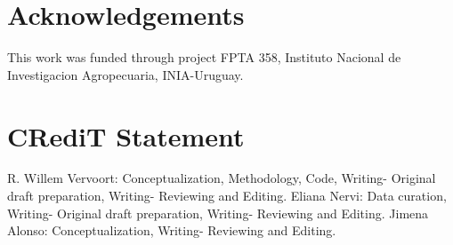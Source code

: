 \documentclass[]{elsarticle} %
\begin{document}
\hypertarget{acknowledgements}{%
\section{Acknowledgements}\label{acknowledgements}}

This work was funded through project FPTA 358, Instituto Nacional de Investigacion Agropecuaria, INIA-Uruguay.

\hypertarget{credit-statement}{%
\section{CRediT Statement}\label{credit-statement}}

R. Willem Vervoort: Conceptualization, Methodology, Code, Writing- Original draft preparation, Writing- Reviewing and Editing. Eliana Nervi: Data curation, Writing- Original draft preparation, Writing- Reviewing and Editing. Jimena Alonso: Conceptualization, Writing- Reviewing and Editing.

\renewcommand\refname{References}

\end{document}
